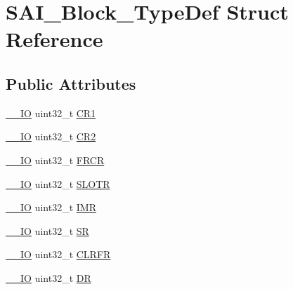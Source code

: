 \hypertarget{struct_s_a_i___block___type_def}{}\section{S\+A\+I\+\_\+\+Block\+\_\+\+Type\+Def Struct Reference}
\label{struct_s_a_i___block___type_def}
\subsection*{Public Attributes}
\begin{DoxyCompactItemize}
\item 
\mbox{\hyperlink{core__sc300_8h_aec43007d9998a0a0e01faede4133d6be}{\+\_\+\+\_\+\+IO}} uint32\+\_\+t \mbox{\hyperlink{struct_s_a_i___block___type_def_a8935f3f22c733c1cb5a05cecf3cfa38c}{C\+R1}}
\item 
\mbox{\hyperlink{core__sc300_8h_aec43007d9998a0a0e01faede4133d6be}{\+\_\+\+\_\+\+IO}} uint32\+\_\+t \mbox{\hyperlink{struct_s_a_i___block___type_def_ad9976416e6199c8c1f7bcdabe20e4bd2}{C\+R2}}
\item 
\mbox{\hyperlink{core__sc300_8h_aec43007d9998a0a0e01faede4133d6be}{\+\_\+\+\_\+\+IO}} uint32\+\_\+t \mbox{\hyperlink{struct_s_a_i___block___type_def_a56001d4b130f392c99dde9a06379af96}{F\+R\+CR}}
\item 
\mbox{\hyperlink{core__sc300_8h_aec43007d9998a0a0e01faede4133d6be}{\+\_\+\+\_\+\+IO}} uint32\+\_\+t \mbox{\hyperlink{struct_s_a_i___block___type_def_aaef957d89b76c3fa2c09ff61ee0db11d}{S\+L\+O\+TR}}
\item 
\mbox{\hyperlink{core__sc300_8h_aec43007d9998a0a0e01faede4133d6be}{\+\_\+\+\_\+\+IO}} uint32\+\_\+t \mbox{\hyperlink{struct_s_a_i___block___type_def_aefcc864961c2bb0465e2ced3bd8b4a14}{I\+MR}}
\item 
\mbox{\hyperlink{core__sc300_8h_aec43007d9998a0a0e01faede4133d6be}{\+\_\+\+\_\+\+IO}} uint32\+\_\+t \mbox{\hyperlink{struct_s_a_i___block___type_def_ad1505a32bdca9a2f8da708c7372cdafc}{SR}}
\item 
\mbox{\hyperlink{core__sc300_8h_aec43007d9998a0a0e01faede4133d6be}{\+\_\+\+\_\+\+IO}} uint32\+\_\+t \mbox{\hyperlink{struct_s_a_i___block___type_def_a52dffdfbe572129cc142023f3daeeffe}{C\+L\+R\+FR}}
\item 
\mbox{\hyperlink{core__sc300_8h_aec43007d9998a0a0e01faede4133d6be}{\+\_\+\+\_\+\+IO}} uint32\+\_\+t \mbox{\hyperlink{struct_s_a_i___block___type_def_a9217ce4fb1e7e16dc0ead8523a6c045a}{DR}}
\end{DoxyCompactItemize}



